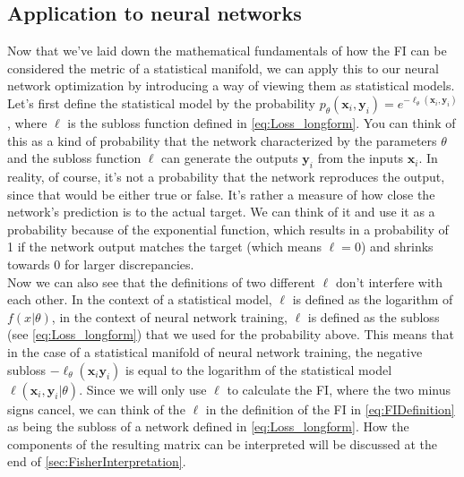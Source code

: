 \subsection{Application to neural networks}\label{sec:ApplicationOfFIToNeuralNetworks}
Now that we've laid down the mathematical fundamentals of how the FI can be considered the metric of a statistical manifold, we can apply this to our neural network optimization by introducing a way of viewing them as statistical models.\\
Let's first define the statistical model by the probability $p_\theta(\mathbf{x}_i,\mathbf{y}_i) = e^{-\ell_\theta(\mathbf{x}_i,\mathbf{y}_i)}$, where $\ell$ is the subloss function defined in \cref{eq:Loss_longform}. You can think of this as a kind of probability that the network characterized by the parameters $\theta$ and the subloss function $\ell$ can generate the outputs $\mathbf{y}_i$ from the inputs $\mathbf{x}_i$. In reality, of course, it's not a probability that the network reproduces the output, since that would be either true or false. It's rather a measure of how close the network's prediction is to the actual target. We can think of it and use it as a probability because of the exponential function, which results in a probability of 1 if the network output matches the target (which means $\ell = 0$) and shrinks towards 0 for larger discrepancies.\\
Now we can also see that the definitions of two different $\ell$ don't interfere with each other. In the context of a statistical model, $\ell$ is defined as the logarithm of $f(x|\theta)$, in the context of neural network training, $\ell$ is defined as the subloss (see \cref{eq:Loss_longform}) that we used for the probability above. This means that in the case of a statistical manifold of neural network training, the negative subloss $-\ell_\theta(\mathbf{x}_i \mathbf{y}_i)$ is equal to the logarithm of the statistical model $\ell(\mathbf{x}_i, \mathbf{y}_i|\theta)$. Since we will only use $\ell$ to calculate the FI, where the two minus signs cancel, we can think of the $\ell$ in the definition of the FI in \cref{eq:FIDefinition} as being the subloss of a network defined in \cref{eq:Loss_longform}. How the components of the resulting matrix can be interpreted will be discussed at the end of \cref{sec:FisherInterpretation}.